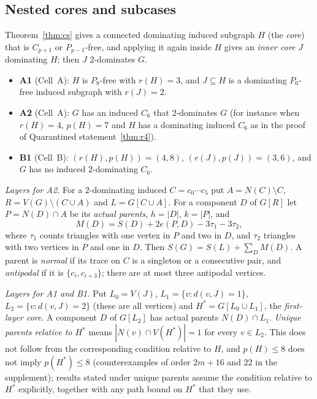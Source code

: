 \documentclass[11pt]{amsart}
\theoremstyle{definition}
\theoremstyle{remark}
\newcommand{\pp}{p}
\begin{document}
\subsection*{Nested cores and subcases}
Theorem~\ref{thm:cs} gives a connected dominating induced subgraph $H$ (the \emph{core}) that is $C_{\pp+1}$ or $P_{\pp-1}$-free, and applying it again inside $H$ gives an \emph{inner core} $J$ dominating $H$; then $J$ $2$-dominates $G$.
\begin{itemize}
\item \textbf{A1} (Cell~A): $H$ is $P_8$-free with $r(H)=3$, and $J\subseteq H$ is a dominating $P_6$-free induced subgraph with $r(J)=2$.
\item \textbf{A2} (Cell~A): $G$ has an induced $C_6$ that $2$-dominates $G$ (for instance when $r(H)=4$, $\pp(H)=7$ and $H$ has a dominating induced $C_6$ as in the proof of Quarantined statement~\ref{thm:r4}).
\item \textbf{B1} (Cell~B): $(r(H),\pp(H))=(4,8)$, $(r(J),\pp(J))=(3,6)$, and $G$ has no induced $2$-dominating $C_6$.
\end{itemize}
\emph{Layers for A2.} For a $2$-dominating induced $C=c_0\cdots c_5$ put $A=N(C)\setminus C$, $R=V(G)\setminus(C\cup A)$ and $L=G[C\cup A]$. For a component $D$ of $G[R]$ let $P=N(D)\cap A$ be its \emph{actual parents}, $h=|D|$, $k=|P|$, and
\[
M(D)=S(D)+2e(P,D)-3\tau_1-3\tau_2,
\]
where $\tau_1$ counts triangles with one vertex in $P$ and two in $D$, and $\tau_2$ triangles with two vertices in $P$ and one in $D$. Then $S(G)=S(L)+\sum_DM(D)$. A parent is \emph{normal} if its trace on $C$ is a singleton or a consecutive pair, and \emph{antipodal} if it is $\{c_i,c_{i+3}\}$; there are at most three antipodal vertices.

\emph{Layers for A1 and B1.} Put $L_0=V(J)$, $L_1=\{v:d(v,J)=1\}$, $L_2=\{v:d(v,J)=2\}$ (these are all vertices) and $H^*=G[L_0\cup L_1]$, the \emph{first-layer core}. A component $D$ of $G[L_2]$ has actual parents $N(D)\cap L_1$. \emph{Unique parents relative to $H^*$} means $|N(v)\cap V(H^*)|=1$ for every $v\in L_2$. This does not follow from the corresponding condition relative to $H$, and $\pp(H)\le8$ does not imply $\pp(H^*)\le8$ (counterexamples of order $2m+16$ and $22$ in the supplement); results stated under unique parents assume the condition relative to $H^*$ explicitly, together with any path bound on $H^*$ that they use.
\end{document}
